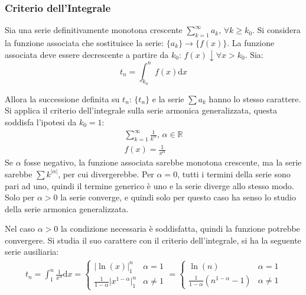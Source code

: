\documentclass{article}
\numberwithin{equation}{subsection}
\begin{document}
\subsubsection{Criterio dell'Integrale}

Sia una serie definitivamente monotona crescente $\sum_{k=1}^\infty a_k,\,\forall k\geq k_0$. 
Si considera la funzione associata che sostituisce la serie: $\{a_k\}\rightarrow\{f(x)\}$. La funzione associata deve essere decrescente a partire da $k_0$: $f(x)\downarrow \forall x>k_0$. Sia:
\begin{equation*}
    t_n=\displaystyle\int_{k_0}^n f(x)\mathrm{d}x
\end{equation*}

Allora la successione definita su $t_n$: $\{t_n\}$ e la serie $\sum a_k$ hanno lo stesso carattere. 
Si applica il criterio dell'integrale sulla serie armonica generalizzata, questa soddisfa l'ipotesi da $k_0=1$:
\begin{gather*}
    \displaystyle\sum_{k=1}^\infty\frac{1}{k^\alpha},\,\alpha\in\mathbb{R}\\
    f(x)=\displaystyle\frac{1}{x^\alpha}
\end{gather*}
Se $\alpha$ fosse negativo, la funzione associata sarebbe monotona crescente, ma la serie sarebbe $\sum k^{|\alpha|}$, per cui divergerebbe. 
Per $\alpha=0$, tutti i termini della serie sono pari ad uno, quindi il termine generico è uno e la serie diverge allo stesso modo. Solo per $\alpha>0$ la serie converge, e quindi solo per questo caso ha senso lo studio della serie armonica generalizzata. 

Nel caso $\alpha>0$ la condizione necessaria è soddisfatta, quindi la funzione potrebbe convergere. Si studia il suo carattere con il criterio dell'integrale, si ha la seguente serie ausiliaria:
\begin{gather*}
    t_n=\displaystyle\int_{1}^n\frac{1}{x^\alpha}\mathrm{d}x=\begin{cases}
        \bigg|\ln(x)\bigg|_1^n &\alpha=1\\
        \displaystyle\frac{1}{1-\alpha}\bigg|x^{1-\alpha}\bigg|_1^n&\alpha\neq1
    \end{cases}=\begin{cases}
        \ln(n)&\alpha=1\\
        \displaystyle\frac{1}{1-\alpha}\left(n^{1-\alpha}-1\right)&\alpha\neq1
    \end{cases}
\end{gather*}
\end{document}
